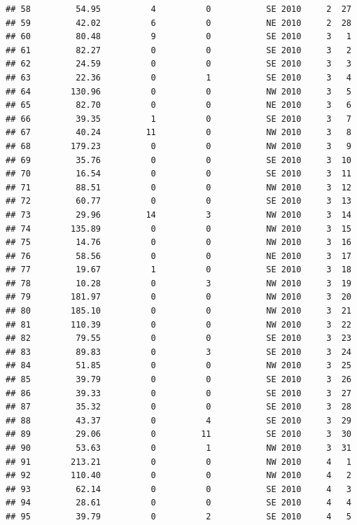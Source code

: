 \documentclass[
]{article}
\begin{document}
\begin{verbatim}
## 58         54.95          4          0           SE 2010     2  27
## 59         42.02          6          0           NE 2010     2  28
## 60         80.48          9          0           SE 2010     3   1
## 61         82.27          0          0           SE 2010     3   2
## 62         24.59          0          0           SE 2010     3   3
## 63         22.36          0          1           SE 2010     3   4
## 64        130.96          0          0           NW 2010     3   5
## 65         82.70          0          0           NE 2010     3   6
## 66         39.35          1          0           SE 2010     3   7
## 67         40.24         11          0           NW 2010     3   8
## 68        179.23          0          0           NW 2010     3   9
## 69         35.76          0          0           SE 2010     3  10
## 70         16.54          0          0           SE 2010     3  11
## 71         88.51          0          0           NW 2010     3  12
## 72         60.77          0          0           SE 2010     3  13
## 73         29.96         14          3           NW 2010     3  14
## 74        135.89          0          0           NW 2010     3  15
## 75         14.76          0          0           NW 2010     3  16
## 76         58.56          0          0           NE 2010     3  17
## 77         19.67          1          0           SE 2010     3  18
## 78         10.28          0          3           NW 2010     3  19
## 79        181.97          0          0           NW 2010     3  20
## 80        185.10          0          0           NW 2010     3  21
## 81        110.39          0          0           NW 2010     3  22
## 82         79.55          0          0           SE 2010     3  23
## 83         89.83          0          3           SE 2010     3  24
## 84         51.85          0          0           NW 2010     3  25
## 85         39.79          0          0           SE 2010     3  26
## 86         39.33          0          0           SE 2010     3  27
## 87         35.32          0          0           SE 2010     3  28
## 88         43.37          0          4           SE 2010     3  29
## 89         29.06          0         11           SE 2010     3  30
## 90         53.63          0          1           NW 2010     3  31
## 91        213.21          0          0           NW 2010     4   1
## 92        110.40          0          0           NW 2010     4   2
## 93         62.14          0          0           SE 2010     4   3
## 94         28.61          0          0           SE 2010     4   4
## 95         39.79          0          2           SE 2010     4   5

\end{verbatim}
\end{document}
